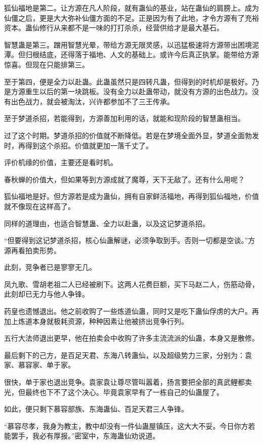 \begin{this_body}
狐仙福地是第二。让方源在凡人阶段，就有蛊仙的基业，站在蛊仙的肩膀上。成为仙僵之后，更是大大弥补仙僵方面的不足。正是因为有了此地，才令方源有了充裕资本。蛊仙修行从来都不是一味的打打杀杀，经营供给才是最大基石。

智慧蛊是第三。蹭用智慧光晕，带给方源无限灵感，以迅猛极速将方源带出困境泥潭。但归根结底，还得落于福地、人文的基础上。或许今后真正执掌。能带给方源惊喜。但现在只能排第三。

至于第四，便是全力以赴蛊。此蛊虽然只是四转凡蛊，但得到的时机却是极好。乃是方源重生以后的第一块跳板。没有全力以赴蛊带动，就没有方源的出色战力。没有出色战力，就会被淘汰，兴许都参加不了三王传承。

至于梦道杀招，若能得到，方源善加利用的话，就能和现阶段的智慧蛊相当。

过了这个时期。梦道杀招的价值就不断降低。若是在梦境全面外显，梦道全面勃发时，再得到这个杀招。价值就更加一落千丈了。

评价机缘的价值，主要还是看时机。

春秋蝉的价值大，但如果等到方源成就了魔尊，天下无敌了。还有什么用呢？

狐仙福地是好。但方源若是成为蛊仙，拥有自家鲜活福地，再得到狐仙福地，价值就不像现在这样高了。

同样的道理由，也适合智慧蛊、全力以赴蛊，以及这记梦道杀招。

“但要得到这记梦道杀招，核心仙蛊解谜，必须争取到手。否则一切都是空谈。”方源再看拍卖形势。

此刻，竞争者已是寥寥无几。

凤九歌、雪胡老祖二人已经被刷下。这两人花费巨额，买下马赵二人，伤筋动骨，此刻却已无力与他人争锋。

药皇也遗憾退出。他之前收购了一些炼道仙蛊，同时又是吃下蛊仙俘虏的大户。再加上炼道本身就极耗资源，种种因素让他被挤出竞争行列。

五行大法师退出更早，他在拍卖会中收购了许多主流流派的仙蛊，本身又是散修。

最后剩下的己方，是百足天君、东海八转蛊仙，以及超级势力三家，分别为：袁家、慕容家、单于家。

很快，单于家也退出竞争。袁家袁让尊尽管叫嚣着，扬言要把全部的真武鲤都卖光，但最终也下不了这个决心。毕竟袁家早有了一栋自己的仙蛊屋了。

如此，便只剩下慕容部族、东海蛊仙、百足天君三人争锋。

“慕容尽孝，我身为教主，教中却没有一件仙蛊屋镇压，这大大不妥。今日你方若能罢手，我必有厚报。”密室中，东海蛊仙劝说道。


\end{this_body}
